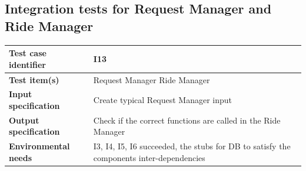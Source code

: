 \documentclass[a4paper,11pt]{report} %
\begin{document}
		\subsection{Integration tests for Request Manager and Ride Manager}
			\begin{minipage}{\linewidth}
			\end{minipage}		
		\begin{center}
			\renewcommand{\arraystretch}{1.2}
			\setlength{\tabcolsep}{24pt}
			\begin{tabular}{ l  p{9cm}}\hline
				\textbf{Test case identifier} & I13\\\hline
				\textbf{Test item(s)} & Request Manager \textrightarrow Ride Manager\\\hline
				\textbf{Input specification} & Create typical Request Manager input \\\hline
				\textbf{Output specification} & Check if the correct functions are called in the Ride Manager\\\hline
				\textbf{Environmental needs} & I3, I4, I5, I6 succeeded, the stubs for DB to satisfy the components inter-dependencies\\\hline
			\end{tabular}
		\end{center}		
		
\end{document}
